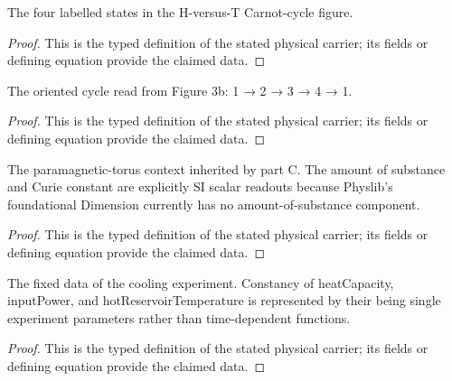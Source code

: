 \begin{definition}
  \label{def:physics:IPhO_2026_3_C_4:aux008}
  The four labelled states in the H-versus-T Carnot-cycle figure.
\end{definition}
\begin{proof}
  This is the typed definition of the stated physical carrier; its fields or defining equation provide the claimed data.
\end{proof}

\begin{definition}
  \label{def:physics:IPhO_2026_3_C_4:aux009}
  The oriented cycle read from Figure 3b: 1 → 2 → 3 → 4 → 1.
\end{definition}
\begin{proof}
  This is the typed definition of the stated physical carrier; its fields or defining equation provide the claimed data.
\end{proof}

\begin{definition}
  \label{def:physics:IPhO_2026_3_C_4:aux010}
  The paramagnetic-torus context inherited by part C. The amount of substance and Curie constant are explicitly SI scalar readouts because Physlib's foundational Dimension currently has no amount-of-substance component.
\end{definition}
\begin{proof}
  This is the typed definition of the stated physical carrier; its fields or defining equation provide the claimed data.
\end{proof}

\begin{definition}
  \label{def:physics:IPhO_2026_3_C_4:aux011}
  The fixed data of the cooling experiment. Constancy of heatCapacity, inputPower, and hotReservoirTemperature is represented by their being single experiment parameters rather than time-dependent functions.
\end{definition}
\begin{proof}
  This is the typed definition of the stated physical carrier; its fields or defining equation provide the claimed data.
\end{proof}


